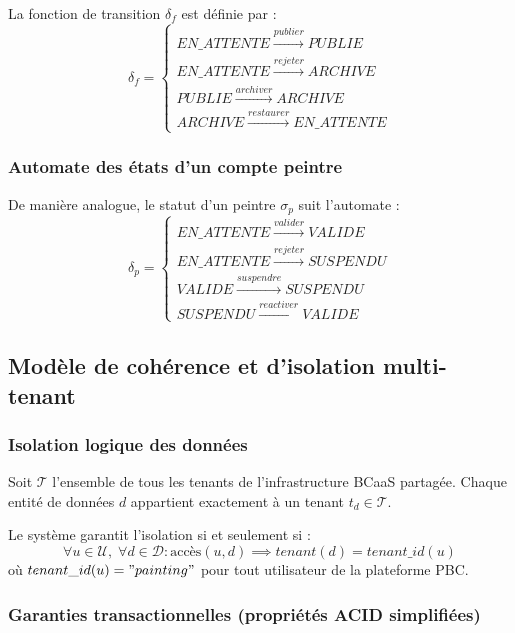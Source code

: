 \documentclass[12pt,a4paper]{report}
\begin{document}
La fonction de transition $\delta_f$ est définie par :
\[
\delta_f =
\begin{cases}
EN\_ATTENTE \xrightarrow{publier} PUBLIE \\
EN\_ATTENTE \xrightarrow{rejeter} ARCHIVE \\
PUBLIE \xrightarrow{archiver} ARCHIVE \\
ARCHIVE \xrightarrow{restaurer} EN\_ATTENTE
\end{cases}
\]

\subsubsection*{Automate des états d'un compte peintre}

De manière analogue, le statut d'un peintre $\sigma_p$ suit l'automate :
\[
\delta_p =
\begin{cases}
EN\_ATTENTE \xrightarrow{valider} VALIDE \\
EN\_ATTENTE \xrightarrow{rejeter} SUSPENDU \\
VALIDE \xrightarrow{suspendre} SUSPENDU \\
SUSPENDU \xrightarrow{reactiver} VALIDE
\end{cases}
\]

\subsection{Modèle de cohérence et d'isolation multi-tenant}

\subsubsection*{Isolation logique des données}

Soit $\mathcal{T}$ l'ensemble de tous les tenants de l'infrastructure BCaaS partagée. Chaque
entité de données $d$ appartient exactement à un tenant $t_d \in \mathcal{T}$.

\begin{definition}
Le système garantit l'isolation si et seulement si :
\[
\forall u \in \mathcal{U},\; \forall d \in \mathcal{D} : \text{accès}(u, d) \implies tenant(d) = tenant\_id(u)
\]
où $tenant\_id(u) = "painting"$ pour tout utilisateur de la plateforme PBC.
\end{definition}

\subsubsection*{Garanties transactionnelles (propriétés ACID simplifiées)}
\end{document}
